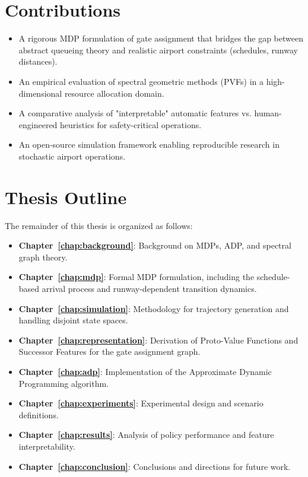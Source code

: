 \section{Contributions}

\begin{itemize}
	\item A rigorous MDP formulation of gate assignment that bridges the gap between abstract queueing theory and realistic airport constraints (schedules, runway distances).
	\item An empirical evaluation of spectral geometric methods (PVFs) in a high-dimensional resource allocation domain.
	\item A comparative analysis of "interpretable" automatic features vs. human-engineered heuristics for safety-critical operations.
	\item An open-source simulation framework enabling reproducible research in stochastic airport operations.
\end{itemize}

\section{Thesis Outline}

The remainder of this thesis is organized as follows:

\begin{itemize}
	\item \textbf{Chapter~\ref{chap:background}}: Background on MDPs, ADP, and spectral graph theory.
	\item \textbf{Chapter~\ref{chap:mdp}}: Formal MDP formulation, including the schedule-based arrival process and runway-dependent transition dynamics.
	\item \textbf{Chapter~\ref{chap:simulation}}: Methodology for trajectory generation and handling disjoint state spaces.
	\item \textbf{Chapter~\ref{chap:representation}}: Derivation of Proto-Value Functions and Successor Features for the gate assignment graph.
	\item \textbf{Chapter~\ref{chap:adp}}: Implementation of the Approximate Dynamic Programming algorithm.
	\item \textbf{Chapter~\ref{chap:experiments}}: Experimental design and scenario definitions.
	\item \textbf{Chapter~\ref{chap:results}}: Analysis of policy performance and feature interpretability.
	\item \textbf{Chapter~\ref{chap:conclusion}}: Conclusions and directions for future work.
\end{itemize}